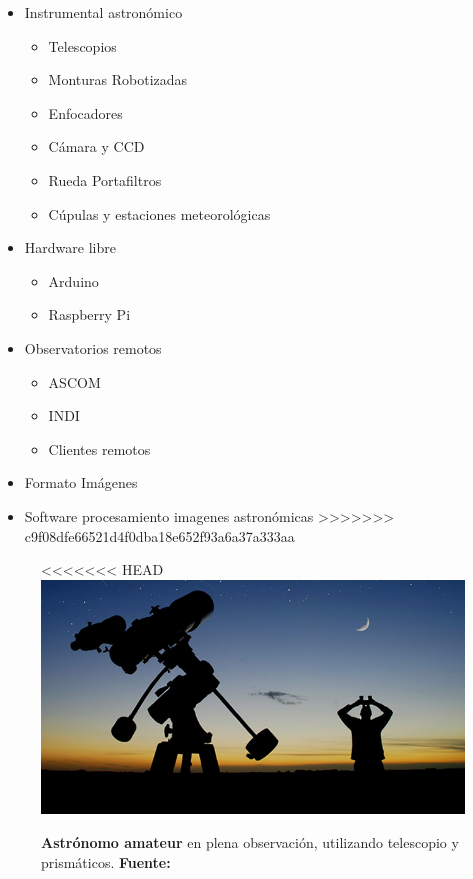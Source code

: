 \begin{itemize}
  \item {Instrumental astronómico}
  \begin{itemize}	
    \item{Telescopios}
    \item{Monturas Robotizadas}
    \item{Enfocadores}
    \item{Cámara y CCD}
    \item{Rueda Portafiltros}
    \item{Cúpulas y estaciones meteorológicas}
      
  \end{itemize}
  
  \item {Hardware libre}
   \begin{itemize}
     \item{Arduino}
     \item{Raspberry Pi}
   \end{itemize}
   
  \item {Observatorios remotos}
   \begin{itemize}
     \item{ASCOM}
     \item{INDI}
     \item{Clientes remotos}
  \end{itemize}
  
  \item{Formato Imágenes}
  \item {Software procesamiento imagenes astronómicas}
>>>>>>> c9f08dfe66521d4f0dba18e652f93a6a37a333aa

\end{itemize}


\begin{figure}[h]
<<<<<<< HEAD
\includegraphics[width=1\linewidth]{../images/observatorio_amateur}
\caption[Observatorio Amateur]{\textbf{Astrónomo amateur} en plena observación, utilizando telescopio y prismáticos. \textbf{Fuente:} \cite{astrociencia}}
\label{fig:observatorio_amateur}
\end{figure}

